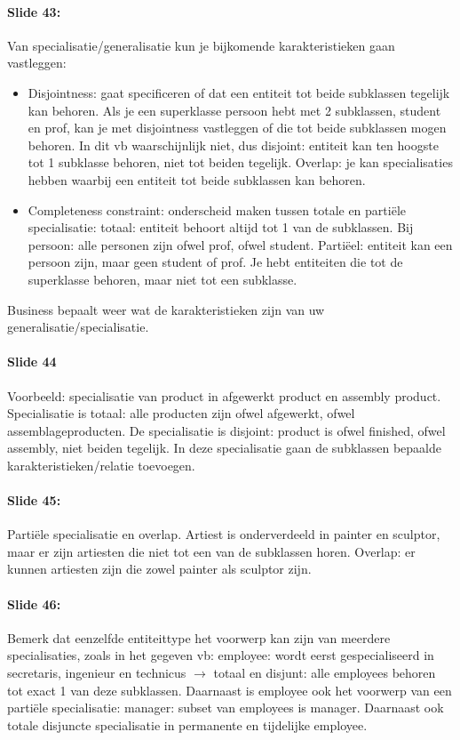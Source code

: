 \documentclass[10pt,a4paper]{report}
\begin{document}
\paragraph{Slide 43:}Van specialisatie/generalisatie kun je bijkomende karakteristieken gaan vastleggen:
\begin{itemize}
\item Disjointness: gaat specificeren of dat een entiteit tot beide subklassen tegelijk kan behoren. Als je een superklasse persoon hebt met 2 subklassen, student en prof, kan je met disjointness vastleggen of die tot beide subklassen mogen behoren. In dit vb waarschijnlijk niet, dus disjoint: entiteit kan ten hoogste tot 1 subklasse behoren, niet tot beiden tegelijk. Overlap: je kan specialisaties hebben waarbij een entiteit tot beide subklassen kan behoren.
\item Completeness constraint: onderscheid maken tussen totale en partiële specialisatie: totaal: entiteit behoort altijd tot 1 van de subklassen. Bij persoon: alle personen zijn ofwel prof, ofwel student. Partiëel: entiteit kan een persoon zijn, maar geen student of prof. Je hebt entiteiten die tot de superklasse behoren, maar niet tot een subklasse.
\end{itemize}
Business bepaalt weer wat de karakteristieken zijn van uw generalisatie/specialisatie.

\paragraph{Slide 44}Voorbeeld: specialisatie van product in afgewerkt product en assembly product. Specialisatie is totaal: alle producten zijn ofwel afgewerkt, ofwel assemblageproducten. De specialisatie is disjoint: product is ofwel finished, ofwel assembly, niet beiden tegelijk. In deze specialisatie gaan de subklassen bepaalde karakteristieken/relatie toevoegen.

\paragraph{Slide 45:}Partiële specialisatie en overlap. Artiest is onderverdeeld in painter en sculptor, maar er zijn artiesten die niet tot een van de subklassen horen. Overlap: er kunnen artiesten zijn die zowel  painter als sculptor zijn.

\paragraph{Slide 46:}Bemerk dat eenzelfde entiteittype het voorwerp kan zijn van meerdere specialisaties, zoals in het gegeven vb: employee: wordt eerst gespecialiseerd in secretaris, ingenieur en technicus $\rightarrow$ totaal en disjunt: alle employees behoren tot exact 1 van deze subklassen. Daarnaast is employee ook het voorwerp van een partiële specialisatie: manager: subset van employees is manager. Daarnaast ook totale disjuncte specialisatie in permanente en tijdelijke employee.
\end{document}
